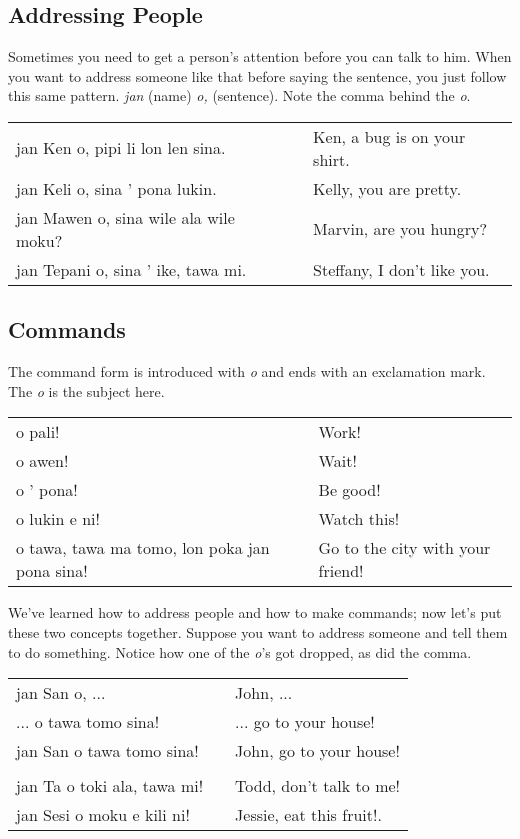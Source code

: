 \subsection*{Addressing People}
%
Sometimes you need to get a person's attention before you can talk to him. 
When you want to address someone like that before saying the sentence, you just follow this same pattern. 
\textit{jan} (name) \textit{o,} (sentence). 
Note the comma behind the \textit{o}. 

\begin{supertabular}{p{5,5cm}|ll}
jan Ken o, pipi li lon len sina. && Ken, a bug is on your shirt. \\
jan Keli o, sina ' pona lukin. && Kelly, you are pretty. \\
jan Mawen o, sina wile ala wile moku? && Marvin, are you hungry? \\
jan Tepani o, sina ' ike, tawa mi. && Steffany, I don't like you. \\
\end{supertabular} 
%
\subsection*{Commands}
%
The command form is introduced with \textit{o} and ends with an exclamation mark.
The \textit{o} is the subject here.

\begin{supertabular}{p{5,5cm}|ll}
o pali! && Work! \\
o awen! && Wait! \\
o ' pona! && Be good! \\
o lukin e ni! && Watch this! \\
o tawa, tawa ma tomo, lon poka jan pona sina! && Go to the city with your friend! \\
\end{supertabular} 

We've learned how to address people and how to make commands; now let's put these two concepts together. 
Suppose you want to address someone and tell them to do something. 
Notice how one of the \textit{o}'s got dropped, as did the comma. 

\begin{supertabular}{p{5,5cm}|ll}
jan San o, ...  && John, ... \\ %
 ... o tawa tomo sina! && ... go to your house! \\ %
jan San o tawa tomo sina!  && John, go to your house! \\
 && \\ %
jan Ta o toki ala, tawa mi! && Todd, don't talk to me! \\
jan Sesi o moku e kili ni! && Jessie, eat this fruit!. \\
\end{supertabular} 

